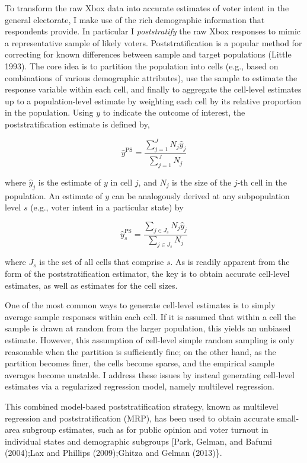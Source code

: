To transform the raw Xbox data into accurate estimates of voter intent
in the general electorate, I make use of the rich demographic
information that respondents provide. In particular I
\emph{poststratify} the raw Xbox responses to mimic a representative
sample of likely voters. Poststratification is a popular method for
correcting for known differences between sample and target populations
(Little 1993). The core idea is to partition the population into cells
(e.g., based on combinations of various demographic attributes), use the
sample to estimate the response variable within each cell, and finally
to aggregate the cell-level estimates up to a population-level estimate
by weighting each cell by its relative proportion in the population.
Using \(y\) to indicate the outcome of interest, the poststratification
estimate is defined by,

\begin{equation*}
\hat{y}^{\text{PS}}=\frac{\sum_{j=1}^JN_j\hat{y}_j}{\sum_{j=1}^JN_j}
\end{equation*}

\noindent where \(\hat{y}_j\) is the estimate of \(y\) in cell \(j\),
and \(N_j\) is the size of the \(j\)-th cell in the population. An
estimate of \(y\) can be analogously derived at any subpopulation level
\(s\) (e.g., voter intent in a particular state) by

\begin{equation*}
\hat{y}_s^{\text{PS}}=\frac{\sum_{j\in J_s}N_j\hat{y}_j}{\sum_{j\in J_s}N_j}
\end{equation*}

\noindent where \(J_s\) is the set of all cells that comprise \(s\). As
is readily apparent from the form of the poststratification estimator,
the key is to obtain accurate cell-level estimates, as well as estimates
for the cell sizes.

One of the most common ways to generate cell-level estimates is to
simply average sample responses within each cell. If it is assumed that
within a cell the sample is drawn at random from the larger population,
this yields an unbiased estimate. However, this assumption of cell-level
simple random sampling is only reasonable when the partition is
sufficiently fine; on the other hand, as the partition becomes finer,
the cells become sparse, and the empirical sample averages become
unstable. I address these issues by instead generating cell-level
estimates via a regularized regression model, namely multilevel
regression.

This combined model-based poststratification strategy, known as
multilevel regression and poststratification (MRP), has been used to
obtain accurate small-area subgroup estimates, such as for public
opinion and voter turnout in individual states and demographic subgroups
{[}Park, Gelman, and Bafumi (2004);Lax and Phillips (2009);Ghitza and
Gelman (2013)\}.

